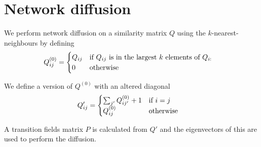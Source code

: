\documentclass{article}
\begin{document}
\section{Network diffusion}

We perform network diffusion on a similarity matrix $Q$ using the $k$-nearest-neighbours
by defining
\begin{align}
  Q^{(0)}_{ij} &= \begin{cases}
    Q_{ij} & \textnormal{if $Q_{ij}$ is in the largest $k$ elements of $Q_{i:}$} \\
    0      & \textnormal{otherwise}
  \end{cases}
\end{align}

We define a version of $Q^{(0)}$ with an altered diagonal
\begin{align}
  Q'_{ij} &= \begin{cases}
    \sum_{j'} Q^{(0)}_{ij'} + 1 & \textnormal{if $i=j$} \\
    Q^{(0)}_{ij}                & \textnormal{otherwise}
  \end{cases}
\end{align}

A transition fields matrix $P$ is calculated from $Q'$ and the eigenvectors of this
are used to perform the diffusion.


\end{document}
